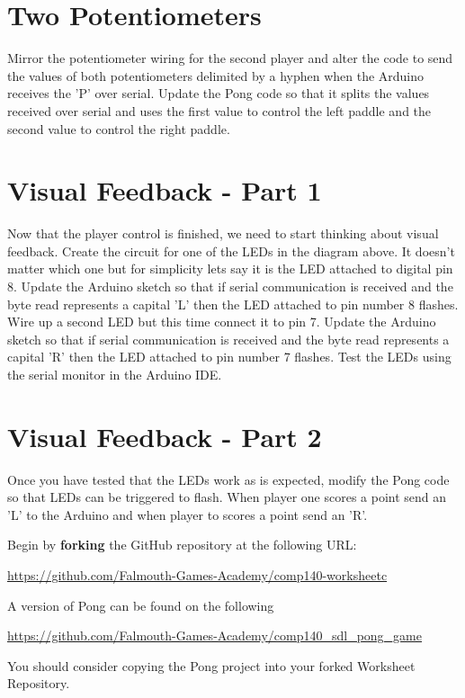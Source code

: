 \documentclass{../../../../fal_assignment}
\begin{document}
\section{Two Potentiometers} \label{arduino-second}
Mirror the potentiometer wiring for the second player and alter the code to send the values of both potentiometers delimited by a hyphen when the Arduino receives the 'P' over serial. Update the Pong code so that it splits the values received over serial and uses the first value to control the left paddle and the second value to control the right paddle. 

\section{Visual Feedback - Part 1} \label{arduino-third}
Now that the player control is finished, we need to start thinking about visual feedback. Create the circuit for one of the LEDs in the diagram above. It doesn't matter which one but for simplicity lets say it is the LED attached to digital pin 8. Update the Arduino sketch so that if serial communication is received and the byte read represents a capital 'L' then the LED attached to pin number 8 flashes. Wire up a second LED but this time connect it to pin 7. Update the Arduino sketch so that if serial communication is received and the byte read represents a capital 'R' then the LED attached to pin number 7 flashes. Test the LEDs using the serial monitor in the Arduino IDE. 

\section{Visual Feedback - Part 2} \label{arduino-fourth}
Once you have tested that the LEDs work as is expected, modify the Pong code so that LEDs can be triggered to flash. When player one scores a point send an 'L' to the Arduino and when player to scores a point send an 'R'.


Begin by \textbf{forking} the GitHub repository at the following URL:

\url{https://github.com/Falmouth-Games-Academy/comp140-worksheetc}

A version of Pong can be found on the following

\url{https://github.com/Falmouth-Games-Academy/comp140_sdl_pong_game}

You should consider copying the Pong project into your forked Worksheet Repository. 
\end{document}
